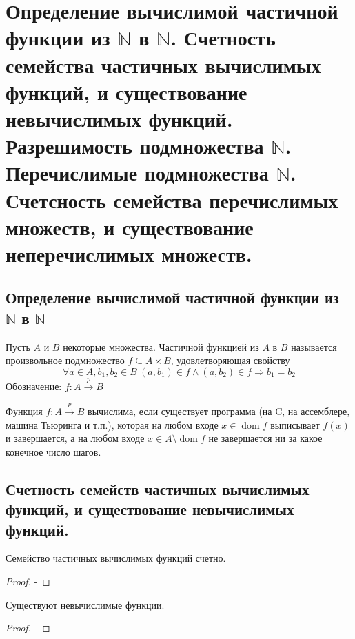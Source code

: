 \section{Определение вычислимой частичной функции из $\mathbb{N}$ в $\mathbb{N}$. Счетность семейства частичных вычислимых функций, и существование невычислимых функций. Разрешимость подмножества $\mathbb{N}$. Перечислимые подмножества $\mathbb{N}$. Счетсность семейства перечислимых множеств, и существование неперечислимых множеств.}



\subsection{Определение вычислимой частичной функции из $\mathbb{N}$ в $\mathbb{N}$}
\begin{definition}
  Пусть $A$ и $B$ некоторые множества. Частичной функцией из $A$ в $B$ называется произвольное подмножество $f \subseteq A \times B$, удовлетворяющая свойству
  \[
    \forall a \in A, b_1,b_2 \in B \> (a,b_1) \in f \wedge (a,b_2) \in f \Rightarrow b_1 = b_2
  \]
  Обозначение: $f:A \overset{p}{\to} B$
\end{definition}

\begin{definition}
  Функция $f: A \overset{p}{\to} B$ вычислима, если существует программа (на C, на ассемблере, машина Тьюринга и т.п.), которая на любом входе $x \in \operatorname{dom} f$ выписывает $f(x)$ и завершается, а на любом входе $x \in A \setminus \operatorname{dom} f$ не завершается ни за какое конечное число шагов.
\end{definition}

\subsection{Счетность семейств частичных вычислимых функций, и существование невычислимых функций.}

\begin{statement}
  Семейство частичных вычислимых функций счетно.
  \begin{proof}
    -
  \end{proof}
\end{statement}

\begin{statement}
  Существуют невычислимые функции.
  \begin{proof}
    -
  \end{proof}
\end{statement}

